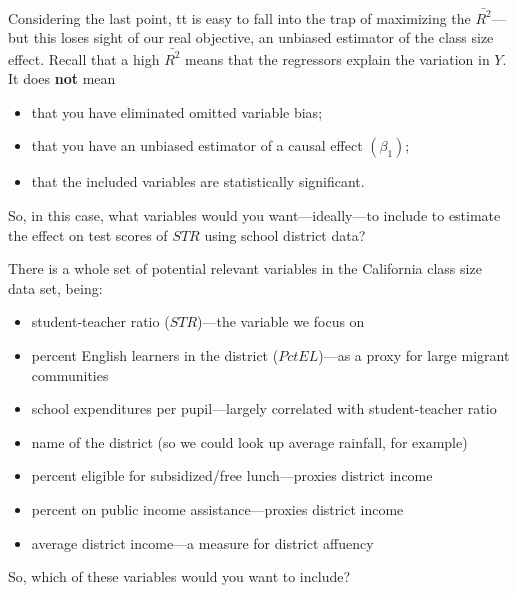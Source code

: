 \documentclass[
]{book}
\providecommand{\tightlist}{%
  \setlength{\itemsep}{0pt}\setlength{\parskip}{0pt}}
\begin{document}
Considering the last point, tt is easy to fall into the trap of maximizing the \(\bar{R^2}\)---but this loses sight of our real objective, an unbiased estimator of the class size effect. Recall that a high \(\bar{R^2}\) means that the regressors explain the variation in \(Y\). It does \textbf{not} mean

\begin{itemize}
\tightlist
\item
  that you have eliminated omitted variable bias;
\item
  that you have an unbiased estimator of a causal effect \((\beta_1)\);
\item
  that the included variables are statistically significant.
\end{itemize}

So, in this case, what variables would you want---ideally---to include to estimate the effect on test scores of \(STR\) using school district data?

There is a whole set of potential relevant variables in the California class size data set, being:

\begin{itemize}
\tightlist
\item
  student-teacher ratio (\(STR\))---the variable we focus on
\item
  percent English learners in the district (\(PctEL\))---as a proxy for large migrant communities
\item
  school expenditures per pupil---largely correlated with student-teacher ratio
\item
  name of the district (so we could look up average rainfall, for example)
\item
  percent eligible for subsidized/free lunch---proxies district income
\item
  percent on public income assistance---proxies district income
\item
  average district income---a measure for district affuency
\end{itemize}

So, which of these variables would you want to include?
\end{document}
